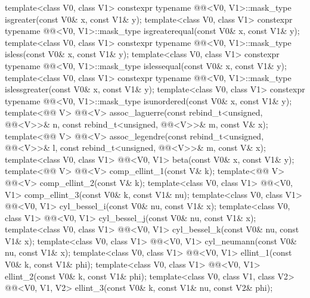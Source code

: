 \begin{codeblock}
{  template<class V0, class V1>
    constexpr typename @@<V0, V1>::mask_type
      isgreater(const V0& x, const V1& y);
  template<class V0, class V1>
    constexpr typename @@<V0, V1>::mask_type
      isgreaterequal(const V0& x, const V1& y);
  template<class V0, class V1>
    constexpr typename @@<V0, V1>::mask_type
      isless(const V0& x, const V1& y);
  template<class V0, class V1>
    constexpr typename @@<V0, V1>::mask_type
      islessequal(const V0& x, const V1& y);
  template<class V0, class V1>
    constexpr typename @@<V0, V1>::mask_type
      islessgreater(const V0& x, const V1& y);
  template<class V0, class V1>
    constexpr typename @@<V0, V1>::mask_type
      isunordered(const V0& x, const V1& y);
  template<@@ V>
    @@<V> assoc_laguerre(const rebind_t<unsigned, @@<V>>& n,
                                    const rebind_t<unsigned, @@<V>>& m, const V& x);
  template<@@ V>
    @@<V> assoc_legendre(const rebind_t<unsigned, @@<V>>& l,
                                    const rebind_t<unsigned, @@<V>>& m, const V& x);
  template<class V0, class V1>
    @@<V0, V1> beta(const V0& x, const V1& y);
  template<@@ V> @@<V> comp_ellint_1(const V& k);
  template<@@ V> @@<V> comp_ellint_2(const V& k);
  template<class V0, class V1>
    @@<V0, V1> comp_ellint_3(const V0& k, const V1& nu);
  template<class V0, class V1>
    @@<V0, V1> cyl_bessel_i(const V0& nu, const V1& x);
  template<class V0, class V1>
    @@<V0, V1> cyl_bessel_j(const V0& nu, const V1& x);
  template<class V0, class V1>
    @@<V0, V1> cyl_bessel_k(const V0& nu, const V1& x);
  template<class V0, class V1>
    @@<V0, V1> cyl_neumann(const V0& nu, const V1& x);
  template<class V0, class V1>
    @@<V0, V1> ellint_1(const V0& k, const V1& phi);
  template<class V0, class V1>
    @@<V0, V1> ellint_2(const V0& k, const V1& phi);
  template<class V0, class V1, class V2>
    @@<V0, V1, V2> ellint_3(const V0& k, const V1& nu, const V2& phi);
}
\end{codeblock}
